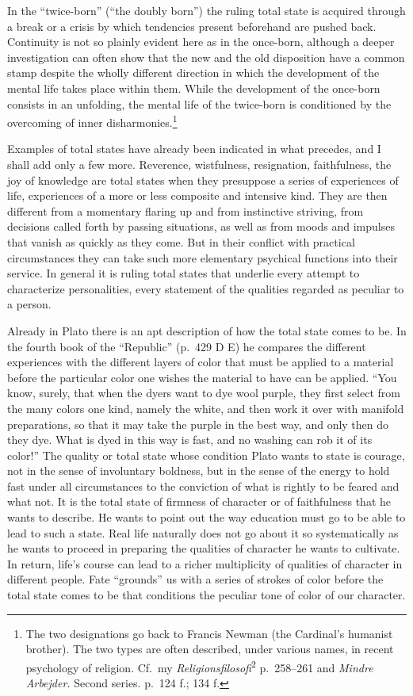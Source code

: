 \documentclass[12pt]{book}
\newcommand{\opage}[1]{\marginnote{\footnotesize\textit{[#1]}}}
\begin{document}
In the ``twice-born'' (``the doubly born'') the ruling total state is acquired
through a break or a crisis by which tendencies present beforehand are pushed
back. Continuity is not so plainly evident here as in the once-born, although a
deeper investigation can often show that the new and the old disposition have a
common stamp despite the wholly different direction in which the development of
the mental life takes place within them. While the development of the once-born
consists in an unfolding, the mental life of the twice-born is conditioned by the
overcoming of inner disharmonies.\footnote{The two designations go back to
Francis Newman (the Cardinal's humanist brother). The two types are often
described, under various names, in recent psychology of religion. Cf.\ my
\textit{Religionsfilosofi}\textsuperscript{2} p.~258--261 and \textit{Mindre
Arbejder.} Second series. p.~124 f.; 134 f.}

Examples of total states have already been indicated in what precedes, and I
shall add only a few more. Reverence, wistfulness, resignation, faithfulness,
the joy of knowledge are total states when they presuppose a series of
experiences of life, experiences of a more or less composite and intensive kind.
They are then different from a momentary flaring up and from instinctive
striving, from decisions called forth by passing situations, as well as from
moods and impulses that vanish as quickly as they come. But in their conflict
with practical circumstances they can take such more elementary psychical
functions into their service. In general it is ruling total states that underlie
every attempt to characterize personalities, every statement of the qualities
regarded as peculiar to a person.

Already in Plato there is an apt description of how \opage{15}the total state
comes to be. In the fourth book of the ``Republic'' (p.~429 D E) he compares the
different experiences with the different layers of color that must be applied to
a material before the particular color one wishes the material to have can be
applied. ``You know, surely, that when the dyers want to dye wool purple, they
first select from the many colors one kind, namely the white, and then work it
over with manifold preparations, so that it may take the purple in the best way,
and only then do they dye. What is dyed in this way is fast, and no washing can
rob it of its color!'' The quality or total state whose condition Plato wants to
state is courage, not in the sense of involuntary boldness, but in the sense of
the energy to hold fast under all circumstances to the conviction of what is
rightly to be feared and what not. It is the total state of firmness of character
or of faithfulness that he wants to describe. He wants to point out the way
education must go to be able to lead to such a state. Real life naturally does
not go about it so systematically as he wants to proceed in preparing the
qualities of character he wants to cultivate. In return, life's course can lead
to a richer multiplicity of qualities of character in different people. Fate
``grounds'' us with a series of strokes of color before the total state comes to
be that conditions the peculiar tone of color of our character.
\end{document}
